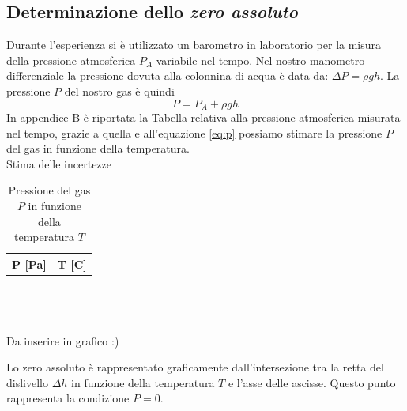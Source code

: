 \subsection{Determinazione dello \emph{zero assoluto}}
Durante l'esperienza si è utilizzato un barometro in laboratorio per la misura della pressione atmosferica $P_A$ variabile nel tempo. Nel nostro manometro differenziale la pressione dovuta alla colonnina di acqua è data da: $\Delta P = \rho gh$. 
La pressione $P$ del nostro gas è quindi 
\begin{equation}
\label{eq:p}
P = P_A + \rho gh
\end{equation}
In appendice B è riportata la Tabella relativa alla pressione atmosferica misurata nel tempo, grazie a quella e all'equazione \eqref{eq:p} possiamo stimare la pressione $P$ del gas in funzione della temperatura.\\
Stima delle incertezze\\
\begin{table}[H]
	\centering
	\begin{tabular}{|c|c|} \hline
		\textbf{P {[Pa]} } & \textbf{T {[\degree C]} }  \\ \hline
		 &   \\ \hline
		 &   \\ \hline
		 &   \\ \hline
		 &   \\ \hline
		 &   \\ \hline
		 &   \\ \hline
		 &   \\ \hline
		 &   \\ \hline
		 &   \\ \hline
		 &   \\ \hline
		 &   \\ \hline
	\end{tabular}
	\caption{Pressione del gas $P$ in funzione della temperatura $T$}
\end{table}

Da inserire in grafico :)


Lo zero assoluto è rappresentato graficamente dall'intersezione tra la retta del dislivello $\Delta h$ in funzione della temperatura $T$ e l'asse delle ascisse.
Questo punto rappresenta la condizione $P = 0$.
